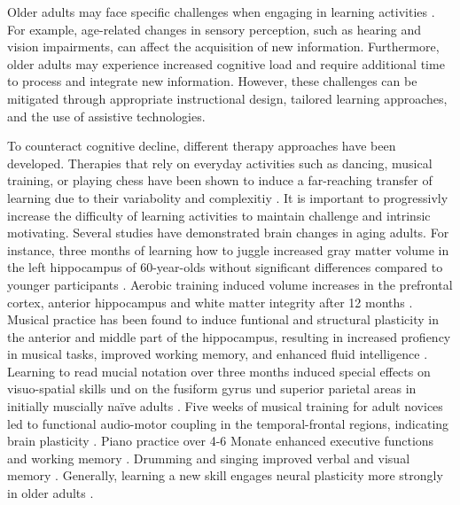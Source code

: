 Older adults may face specific challenges when engaging in learning activities \cite{Zeki2021}. For example, age-related changes in sensory perception, such as hearing and vision impairments, can affect the acquisition of new information. Furthermore, older adults may experience increased cognitive load and require additional time to process and integrate new information. However, these challenges can be mitigated through appropriate instructional design, tailored learning approaches, and the use of assistive technologies.

To counteract cognitive decline, different therapy approaches have been developed. Therapies that rely on everyday activities such as dancing, musical training, or playing chess have been shown to induce a far-reaching transfer of learning due to their variabolity and complexitiy \cite{Shawn2008, Shawn2014}. It is important to progressivly increase the difficulty of learning activities to maintain challenge and intrinsic motivating. Several studies have demonstrated brain changes in aging adults. For instance, three months of learning how to juggle increased gray matter volume in the left hippocampus of 60-year-olds without significant differences compared to younger participants \cite{Boyke2008}. Aerobic training induced volume increases in the prefrontal cortex, anterior hippocampus and white matter integrity after 12 months \cite{Hedden2004, Erickson2011, Colcombe2006}. Musical practice has been found to induce funtional and structural plasticity in the anterior and middle part of the hippocampus, resulting in increased profiency in musical tasks, improved working memory, and enhanced fluid intelligence \cite{Oechslin2013, Groussard2010, Herdener2010, James2008}. Learning to read mucial notation over three months induced special effects on visuo-spatial skills und on the fusiform gyrus und superior parietal areas in initially muscially naïve adults \cite{Stewart2003, Stewart2005}. Five weeks of musical training for adult novices led to functional audio-motor coupling in the temporal-frontal regions, indicating brain plasticity \cite{Lappe2008, Bangert2003, Lahav2007}. Piano practice over 4-6 Monate enhanced executive functions and working memory \cite{Seinfeld2013, Bugos2007}. Drumming and singing improved verbal and visual memory \cite{Dege2018}. Generally, learning a new skill engages neural plasticity more strongly in older adults \cite{Greenwood2010}. 



